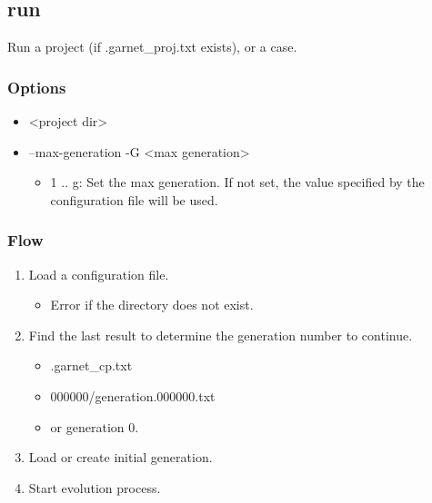 \documentclass[]{article}
\begin{document}
\subsection{run}\label{run}

Run a project (if .garnet\_proj.txt exists), or a case.

\subsubsection{Options}\label{options-2}

\begin{itemize}
\itemsep1pt\parskip0pt
\item
  \textless{}project dir\textgreater{}
\item
  --max-generation -G \textless{}max generation\textgreater{}

  \begin{itemize}
  \itemsep1pt\parskip0pt
  \item
    1 .. g: Set the max generation. If not set, the value specified by
    the configuration file will be used.
  \end{itemize}
\end{itemize}

\subsubsection{Flow}\label{flow-2}

\begin{enumerate}
\def\labelenumi{\arabic{enumi}.}
\itemsep1pt\parskip0pt
\item
  Load a configuration file.

  \begin{itemize}
  \itemsep1pt\parskip0pt
  \item
    Error if the directory does not exist.
  \end{itemize}
\item
  Find the last result to determine the generation number to continue.

  \begin{itemize}
  \itemsep1pt\parskip0pt
  \item
    .garnet\_cp.txt
  \item
    000000/generation.000000.txt
  \item
    or generation 0.
  \end{itemize}
\item
  Load or create initial generation.
\item
  Start evolution process.
\end{enumerate}
\end{document}

